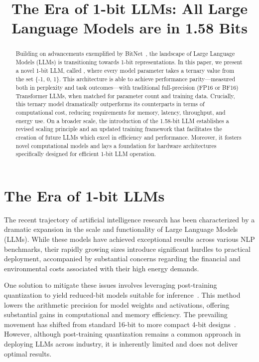 \title{The Era of 1-bit LLMs: All Large Language Models are in 1.58 Bits}

\begin{abstract}
Building on advancements exemplified by BitNet~\cite{bitnet}, the landscape of Large Language Models (LLMs) is transitioning towards 1-bit representations. In this paper, we present a novel 1-bit LLM, called \textbf{}, where every model parameter takes a ternary value from the set \{-1, 0, 1\}. This architecture is able to achieve performance parity—measured both in perplexity and task outcomes—with traditional full-precision (FP16 or BF16) Transformer LLMs, when matched for parameter count and training data. Crucially, this ternary model dramatically outperforms its counterparts in terms of computational cost, reducing requirements for memory, latency, throughput, and energy use. On a broader scale, the introduction of the 1.58-bit LLM establishes a revised scaling principle and an updated training framework that facilitates the creation of future LLMs which excel in efficiency and performance. Moreover, it fosters novel computational models and lays a foundation for hardware architectures specifically designed for efficient 1-bit LLM operation.
\end{abstract}

\section{The Era of 1-bit LLMs}

The recent trajectory of artificial intelligence research has been characterized by a dramatic expansion in the scale and functionality of Large Language Models (LLMs). While these models have achieved exceptional results across various NLP benchmarks, their rapidly growing sizes introduce significant hurdles to practical deployment, accompanied by substantial concerns regarding the financial and environmental costs associated with their high energy demands.

One solution to mitigate these issues involves leveraging post-training quantization to yield reduced-bit models suitable for inference~\cite{smoothquant, gptq, quip, quip_sharp}. This method lowers the arithmetic precision for model weights and activations, offering substantial gains in computational and memory efficiency. The prevailing movement has shifted from standard 16-bit to more compact 4-bit designs~\cite{gptq, awq}. However, although post-training quantization remains a common approach in deploying LLMs across industry, it is inherently limited and does not deliver optimal results.

